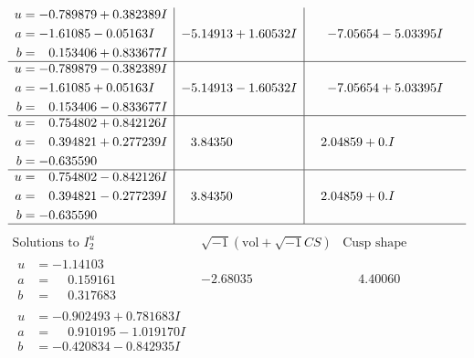 \documentclass[1p]{elsarticle_modified}
\theoremstyle{definition}
\newcommand{\I}{\sqrt{-1}}
\begin{document}
$$\begin{array}{c|c|c}
\begin{aligned}
u &= -0.789879 + 0.382389 I \\
a &= -1.61085 - 0.05163 I \\
b &= \phantom{-}0.153406 + 0.833677 I\end{aligned}
 & -5.14913 + 1.60532 I & -7.05654 - 5.03395 I \\ \hline\begin{aligned}
u &= -0.789879 - 0.382389 I \\
a &= -1.61085 + 0.05163 I \\
b &= \phantom{-}0.153406 - 0.833677 I\end{aligned}
 & -5.14913 - 1.60532 I & -7.05654 + 5.03395 I \\ \hline\begin{aligned}
u &= \phantom{-}0.754802 + 0.842126 I \\
a &= \phantom{-}0.394821 + 0.277239 I \\
b &= -0.635590\phantom{ +0.000000I}\end{aligned}
 & \phantom{-}3.84350\phantom{ +0.000000I} & \phantom{-}2.04859 + 0. I\phantom{ +0.000000I} \\ \hline\begin{aligned}
u &= \phantom{-}0.754802 - 0.842126 I \\
a &= \phantom{-}0.394821 - 0.277239 I \\
b &= -0.635590\phantom{ +0.000000I}\end{aligned}
 & \phantom{-}3.84350\phantom{ +0.000000I} & \phantom{-}2.04859 + 0. I\phantom{ +0.000000I}\\
 \hline 
 \end{array}$$\newpage$$\begin{array}{c|c|c}  
\text{Solutions to }I^u_{2}& \I (\text{vol} + \sqrt{-1}CS) & \text{Cusp shape}\\
 \hline 
\begin{aligned}
u &= -1.14103\phantom{ +0.000000I} \\
a &= \phantom{-}0.159161\phantom{ +0.000000I} \\
b &= \phantom{-}0.317683\phantom{ +0.000000I}\end{aligned}
 & -2.68035\phantom{ +0.000000I} & \phantom{-}4.40060\phantom{ +0.000000I} \\ \hline\begin{aligned}
u &= -0.902493 + 0.781683 I \\
a &= \phantom{-}0.910195 - 1.019170 I \\
b &= -0.420834 - 0.842935 I\end{aligned}

\end{array}$$
\end{document}
